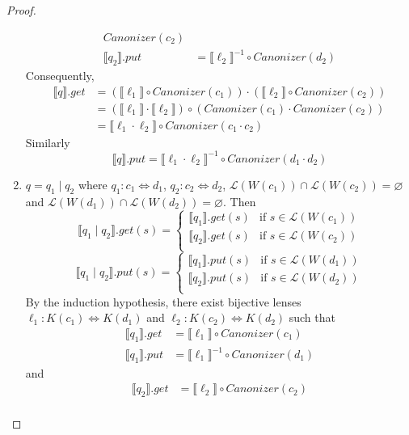 \documentclass{svproc}
\newcommand{\sep}{\ensuremath{\; | \;}}
\newcommand{\canonizer}{\ensuremath{\mathit{Canonizer}}}
\begin{document}
\begin{proof}
\begin{enumerate}
\begin{align*}
\canonizer(c_2)\\
\llbracket q_2 \rrbracket.put &= {\llbracket \ell_2 \rrbracket}^{-1} \circ
\canonizer(d_2)
\end{align*}
Consequently,
\begin{align*}
  \llbracket q \rrbracket.get &= (\llbracket \ell_1 \rrbracket \circ
\canonizer(c_1)) \cdot  (\llbracket \ell_2 \rrbracket \circ
\canonizer(c_2))\\
&= (\llbracket \ell_1 \rrbracket \cdot \llbracket \ell_2
\rrbracket) \circ (\canonizer(c_1) \cdot \canonizer(c_2))\\
&= \llbracket \ell_1 \cdot  \ell_2 \rrbracket \circ \canonizer(c_1 \cdot c_2)
\end{align*}
Similarly
$$
  \llbracket q \rrbracket.put = \llbracket \ell_1 \cdot  \ell_2 \rrbracket^{-1}
  \circ \canonizer(d_1 \cdot d_2) $$
  \item
  $q = q_1 \sep q_2$ where $q_1 : c_1 \Leftrightarrow d_1 $, $q_2 : c_2
  \Leftrightarrow d_2$, $\mathcal{L}(W(c_1)) \cap \mathcal{L}(W(c_2)) =
  \varnothing$ and $\mathcal{L}(W(d_1)) \cap \mathcal{L}(W(d_2)) = \varnothing$.
  Then
  $$
  \llbracket q_1 \sep q_2 \rrbracket.get(s) = 
  \begin{cases}
  \llbracket q_1 \rrbracket.get (s) & \text{if } s \in \mathcal{L}(W(c_1))\\
  \llbracket q_2 \rrbracket.get (s) & \text{if } s \in \mathcal{L}(W(c_2))\\
  \end{cases}$$
  $$\llbracket q_1 \sep q_2 \rrbracket.put(s) = 
  \begin{cases}
  \llbracket q_1 \rrbracket.put (s) & \text{if } s \in \mathcal{L}(W(d_1))\\
  \llbracket q_2 \rrbracket.put (s) & \text{if } s \in \mathcal{L}(W(d_2))\\
  \end{cases}
  $$
By the induction hypothesis, there exist bijective lenses $\ell_1 : K(c_1)
\Leftrightarrow K(d_1)$ and $\ell_2 : K(c_2) \Leftrightarrow K(d_2)$ such that
\begin{align*}
\llbracket q_1 \rrbracket.get &= \llbracket \ell_1 \rrbracket \circ
\canonizer(c_1)\\
\llbracket q_1 \rrbracket.put &= {\llbracket \ell_1 \rrbracket}^{-1} \circ
\canonizer(d_1)
\end{align*}
and
\begin{align*}
\llbracket q_2 \rrbracket.get &= \llbracket \ell_2 \rrbracket \circ
\canonizer(c_2)\\

\end{align*}
\end{enumerate}
\end{proof}
\end{document}
